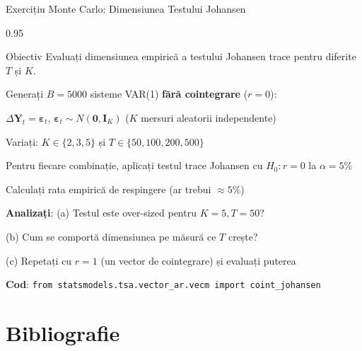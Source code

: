\documentclass[9pt, aspectratio=169, t]{beamer}
\begin{document}
\begin{frame}{Exercițiu Monte Carlo: Dimensiunea Testului Johansen}
    \begin{cminipage}{0.95\textwidth}
        \begin{block}{Obiectiv}
            Evaluați dimensiunea empirică a testului Johansen trace pentru diferite $T$ și $K$.
        \end{block}
        \begin{enumerate}\setlength{\itemsep}{2pt}
            {\small
            \item Generați $B = 5000$ sisteme VAR(1) \textbf{fără cointegrare} ($r = 0$):
            \item[] $\Delta \mathbf{Y}_t = \boldsymbol{\varepsilon}_t$, $\boldsymbol{\varepsilon}_t \sim N(\mathbf{0}, \mathbf{I}_K)$  ($K$ mersuri aleatorii independente)
            \item Variați: $K \in \{2, 3, 5\}$ și $T \in \{50, 100, 200, 500\}$
            \item Pentru fiecare combinație, aplicați testul trace Johansen cu $H_0: r = 0$ la $\alpha = 5\%$
            \item Calculați rata empirică de respingere (ar trebui $\approx 5\%$)
            \item \textbf{Analizați}: (a) Testul este over-sized pentru $K = 5, T = 50$?
            \item[] (b) Cum se comportă dimensiunea pe măsură ce $T$ crește?
            \item[] (c) Repetați cu $r = 1$ (un vector de cointegrare) și evaluați puterea
            }
        \end{enumerate}
        {\footnotesize \textbf{Cod}: \texttt{from statsmodels.tsa.vector\_ar.vecm import coint\_johansen}}
    \end{cminipage}
\end{frame}
\section{Bibliografie}
\end{document}
